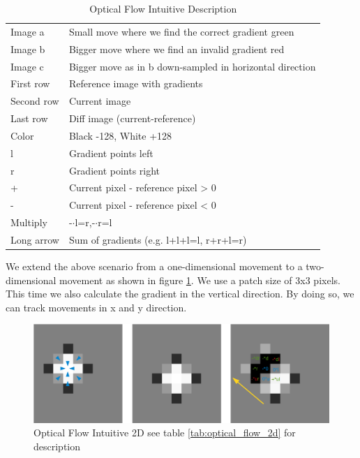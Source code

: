 \documentclass[11pt,a4paper,titlepage,oneside]{report}
\begin{document}
\begin{table}[H]
   \centering
   \begin{tabular}{l l}
      Image a & Small move where we find the correct gradient green\\
      Image b & Bigger move where we find an invalid gradient red\\
      Image c & Bigger move as in b down-sampled in horizontal direction\\
      First row & Reference image with gradients\\
      Second row & Current image\\
      Last row & Diff image (current-reference)\\
      Color & Black -128, White +128\\
      l & Gradient points left\\
      r & Gradient points right\\
      + & Current pixel - reference pixel > 0\\
      - & Current pixel - reference pixel < 0\\
      Multiply & -$\cdot$l=r,-$\cdot$r=l\\
      Long arrow & Sum of gradients (e.g. l+l+l=l, r+r+l=r)
   \end{tabular}
   \caption{Optical Flow Intuitive Description}
   \label{tab:optical_flow_intuitive}
\end{table}

We extend the above scenario from a one-dimensional movement to a two-dimensional movement as shown in figure \ref{fig:optical_flow_2d}. We use a patch size of 3x3 pixels. This time we also calculate the gradient in the vertical direction. By doing so, we can track movements in x and y direction.

\begin{figure}[H]
  \includegraphics[width=1.0\textwidth]{img/optical_flow_2d.png}
  \caption{Optical Flow Intuitive 2D see table \ref{tab:optical_flow_2d} for description}
  \label{fig:optical_flow_2d}
\end{figure}
\end{document}
